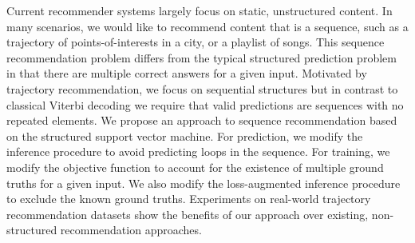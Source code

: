 
Current recommender systems largely focus on static, unstructured content.
In many scenarios, we would like to recommend content that is a sequence, %
such as %
a trajectory of points-of-interests in a city, or a playlist of songs.
This sequence recommendation problem 
differs from the typical structured prediction problem
in that there are multiple correct answers for a given input.
Motivated by trajectory recommendation, we focus on sequential structures
but in contrast to classical Viterbi decoding we require that
valid predictions are sequences with no repeated elements.
We propose an approach to sequence recommendation based on the structured support vector machine.
For prediction, we modify the inference procedure to avoid predicting loops in the sequence.
For training, we modify the objective function to account for the existence of multiple ground truths for a given input. We also modify the loss-augmented inference procedure to exclude the known ground truths.
Experiments on real-world trajectory recommendation datasets show the benefits of our approach over existing, non-structured recommendation approaches.
